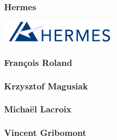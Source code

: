 \begin{frame}
\frametitle{Hermes}
\includegraphics[keepaspectratio,width=0.6\linewidth]{img/hermes}
\end{frame}

\begin{frame}
\frametitle{François Roland}
\end{frame}

\begin{frame}
\frametitle{Krzysztof Magusiak}
\end{frame}

\begin{frame}
\frametitle{Michaël Lacroix}
\end{frame}

\begin{frame}
\frametitle{Vincent Gribomont}
\end{frame}

